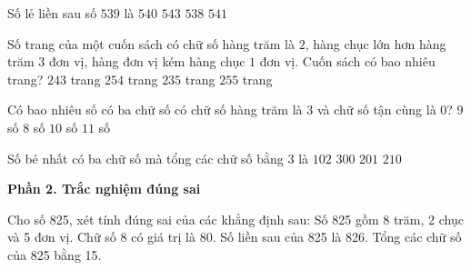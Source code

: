 \begin{ex} %
Số lẻ liền sau số $539$ là
\choice
{$540$}
{$543$}
{$538$}
{\True $541$}
\end{ex}

\begin{ex} %
Số trang của một cuốn sách có chữ số hàng trăm là $2$, hàng chục lớn hơn hàng trăm $3$ đơn vị, hàng đơn vị kém hàng chục $1$ đơn vị. Cuốn sách có bao nhiêu trang?
\choice
{$243$ trang}
{\True $254$ trang}
{$235$ trang}
{$255$ trang}
\end{ex}

\begin{ex} %
Có bao nhiêu số có ba chữ số có chữ số hàng trăm là $3$ và chữ số tận cùng là $0$?
\choice
{$9$ số}
{$8$ số}
{\True $10$ số}
{$11$ số}
\end{ex}

\begin{ex} %
Số bé nhất có ba chữ số mà tổng các chữ số bằng $3$ là
\choice
{\True $102$}
{$300$}
{$201$}
{$210$}
\end{ex}

\textbf{Phần 2. Trắc nghiệm đúng sai}

\begin{ex} %
Cho số 825, xét tính đúng sai của các khẳng định sau:
\choiceTF
{\True Số 825 gồm 8 trăm, 2 chục và 5 đơn vị.}
{Chữ số 8 có giá trị là 80.}
{\True Số liền sau của 825 là 826.}
{\True Tổng các chữ số của 825 bằng 15.}
\end{ex}

